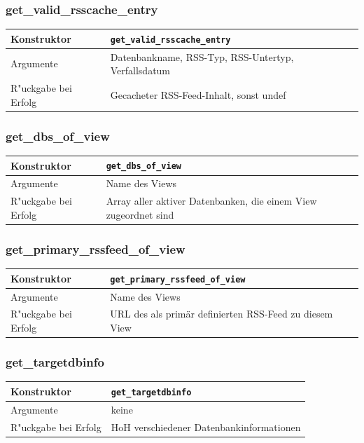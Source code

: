 \documentclass[11pt, twoside, a4paper, BCOR8mm, DIV12, bibtotoc,idxtotoc]{scrbook}
\begin{document}
\subsubsection{get\_valid\_rsscache\_entry}
\begin{shadowenv}
\begin{tabular}{lp{10cm}}
  Konstruktor & \texttt{get\_valid\_rsscache\_entry}\\
  \hline
  Argumente     & Datenbankname, RSS-Typ, RSS-Untertyp, Verfallsdatum\\
  R"uckgabe bei Erfolg & Gecacheter RSS-Feed-Inhalt, sonst undef\\
\end{tabular}
\end{shadowenv}

\subsubsection{get\_dbs\_of\_view}
\begin{shadowenv}
\begin{tabular}{lp{10cm}}
  Konstruktor & \texttt{get\_dbs\_of\_view}\\
  \hline
  Argumente     & Name des Views\\
  R"uckgabe bei Erfolg & Array aller aktiver Datenbanken, die einem
  View zugeordnet sind\\
\end{tabular}
\end{shadowenv}

\subsubsection{get\_primary\_rssfeed\_of\_view}
\begin{shadowenv}
\begin{tabular}{lp{10cm}}
  Konstruktor & \texttt{get\_primary\_rssfeed\_of\_view}\\
  \hline
  Argumente     & Name des Views\\
  R"uckgabe bei Erfolg & URL des als primär definierten RSS-Feed zu
  diesem View\\
\end{tabular}
\end{shadowenv}

\subsubsection{get\_targetdbinfo}
\begin{shadowenv}
\begin{tabular}{lp{10cm}}
  Konstruktor & \texttt{get\_targetdbinfo}\\
  \hline
  Argumente     & keine\\
  R"uckgabe bei Erfolg & HoH verschiedener Datenbankinformationen\\
\end{tabular}
\end{shadowenv}
\end{document}
